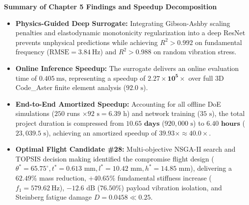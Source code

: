 \begin{svgraybox}
\textbf{Summary of Chapter 5 Findings and Speedup Decomposition}
\begin{itemize}
\item \textbf{Physics-Guided Deep Surrogate:} Integrating Gibson-Ashby scaling penalties and elastodynamic monotonicity regularization into a deep ResNet prevents unphysical predictions while achieving $R^2 > 0.992$ on fundamental frequency ($\text{RMSE} = \SI{3.84}{\hertz}$) and $R^2 > 0.988$ on random vibration stress.
\item \textbf{Online Inference Speedup:} The surrogate delivers an online evaluation time of $\SI{0.405}{\milli\second}$, representing a speedup of $\mathbf{2.27 \times 10^5\times}$ over full 3D Code\_Aster finite element analysis ($92.0\text{ s}$).
\item \textbf{End-to-End Amortized Speedup:} Accounting for all offline DoE simulations ($250$ runs $\times 92\text{ s} = 6.39\text{ h}$) and network training ($35\text{ s}$), the total project duration is compressed from $\mathbf{10.65\text{ days}}$ ($920{,}000\text{ s}$) to $\mathbf{6.40\text{ hours}}$ ($23{,}039.5\text{ s}$), achieving an amortized speedup of $\mathbf{39.93\times \approx 40.0\times}$.
\item \textbf{Optimal Flight Candidate \#28:} Multi-objective NSGA-II search and TOPSIS decision making identified the compromise flight design ($\theta^* = 65.75^\circ, t^* = 0.613\text{ mm}, l^* = 10.42\text{ mm}, h^* = 14.85\text{ mm}$), delivering a $62.49\%$ mass reduction, $+40.65\%$ fundamental stiffness increase ($f_1 = \SI{579.62}{\hertz}$), $-12.6\text{ dB}$ ($76.50\%$) payload vibration isolation, and Steinberg fatigue damage $D = 0.0458 \ll 0.25$.
\end{itemize}
\end{svgraybox}

